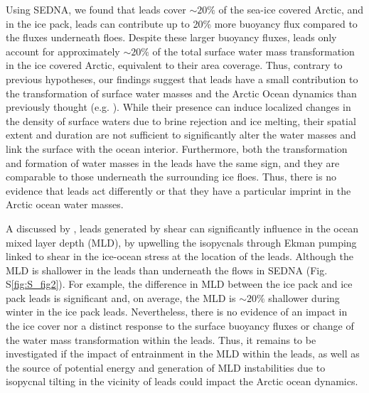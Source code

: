 \documentclass[lineno,sn-basic]{sn-jnl}%
\begin{document}
Using SEDNA, we found that leads cover $\sim 20\%$ of the sea-ice covered Arctic, and in the ice pack, leads can contribute up to 20\% more buoyancy flux compared to the fluxes underneath floes. Despite these larger buoyancy fluxes, leads only account for approximately $\sim 20\%$ of the total surface water mass transformation in the ice covered Arctic, equivalent to their area coverage. Thus, contrary to previous hypotheses, our findings suggest that leads have a small contribution to the transformation of surface water masses and the Arctic Ocean dynamics than previously thought (e.g. \citealp{Hutter_identification_2019, McPhee_LKF_2005}). While their presence can induce localized changes in the density of surface waters due to brine rejection and ice melting, their spatial extent and duration are not sufficient to significantly alter the water masses and link the surface with the ocean interior. Furthermore, both the transformation and formation of water masses in the leads have the same sign, and they are comparable to those underneath the surrounding ice floes. Thus, there is no evidence that leads act differently or that they have a particular imprint in the Arctic ocean water masses.

A discussed by \citealt{McPhee_LKF_2005}, leads generated by shear can significantly influence in the ocean mixed layer depth (MLD), by upwelling the isopycnals through Ekman pumping linked to shear in the ice-ocean stress at the location of the leads. Although the MLD is shallower in the leads than underneath the flows in SEDNA (Fig. S\ref{fig:S_fig2}). For example, the difference in MLD between the ice pack and ice pack leads is significant and, on average, the MLD is $\sim 20\%$ shallower during winter in the ice pack leads. Nevertheless, there is no evidence of an impact in the ice cover nor a distinct response to the surface buoyancy fluxes or change of the water mass transformation within the leads. Thus, it remains to be investigated if the impact of entrainment in the MLD within the leads, as well as the source of potential energy and generation of MLD instabilities due to isopycnal tilting in the vicinity of leads could impact the Arctic ocean dynamics.
\end{document}
